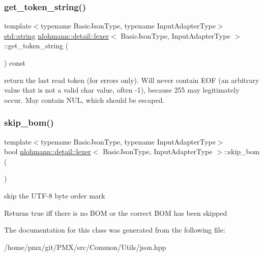 \subsubsection{\texorpdfstring{get\+\_\+token\+\_\+string()}{get\_token\_string()}}
{\footnotesize\ttfamily template$<$typename Basic\+Json\+Type, typename Input\+Adapter\+Type$>$ \\
\hyperlink{namespacenlohmann_1_1detail_a1ed8fc6239da25abcaf681d30ace4985ab45cffe084dd3d20d928bee85e7b0f21}{std\+::string} \hyperlink{classnlohmann_1_1detail_1_1lexer}{nlohmann\+::detail\+::lexer}$<$ Basic\+Json\+Type, Input\+Adapter\+Type $>$\+::get\+\_\+token\+\_\+string (\begin{DoxyParamCaption}{ }\end{DoxyParamCaption}) const\hspace{0.3cm}{\ttfamily [inline]}}

return the last read token (for errors only). Will never contain E\+OF (an arbitrary value that is not a valid char value, often -\/1), because 255 may legitimately occur. May contain N\+UL, which should be escaped. \mbox{\label{classnlohmann_1_1detail_1_1lexer_a7cd7d55de2cd398660bc243c7229caf9}} 
\subsubsection{\texorpdfstring{skip\+\_\+bom()}{skip\_bom()}}
{\footnotesize\ttfamily template$<$typename Basic\+Json\+Type, typename Input\+Adapter\+Type$>$ \\
bool \hyperlink{classnlohmann_1_1detail_1_1lexer}{nlohmann\+::detail\+::lexer}$<$ Basic\+Json\+Type, Input\+Adapter\+Type $>$\+::skip\+\_\+bom (\begin{DoxyParamCaption}{ }\end{DoxyParamCaption})\hspace{0.3cm}{\ttfamily [inline]}}



skip the U\+T\+F-\/8 byte order mark 

\begin{DoxyReturn}{Returns}
true iff there is no B\+OM or the correct B\+OM has been skipped 
\end{DoxyReturn}


The documentation for this class was generated from the following file\+:\begin{DoxyCompactItemize}
\item 
/home/pmx/git/\+P\+M\+X/src/\+Common/\+Utils/json.\+hpp\end{DoxyCompactItemize}
